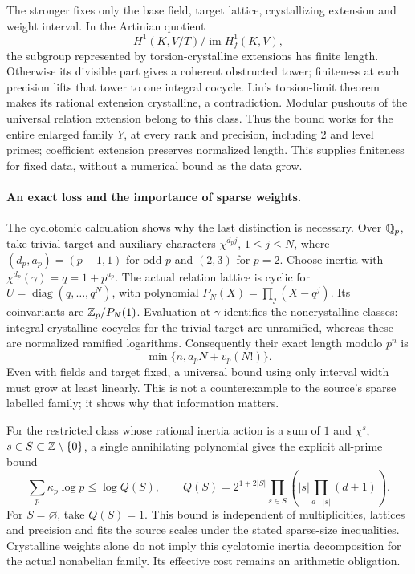 The stronger
 fixes only the base field, target lattice, crystallizing
extension and weight interval. In the Artinian quotient
\[
 H^1(K,V/T)\big/\operatorname{im}H_f^1(K,V),
\]
the subgroup represented by torsion-crystalline extensions has finite
length. Otherwise its divisible part gives a coherent obstructed tower;
finiteness at each precision lifts that tower to one integral cocycle.
Liu's torsion-limit theorem makes its rational extension crystalline,
a contradiction. Modular pushouts of the universal relation extension
belong to this class. Thus the bound works for the entire enlarged
family \(Y\), at every rank and precision, including 2 and level primes;
coefficient extension preserves normalized length. This supplies
finiteness for fixed data, without a numerical bound as the data grow.

\paragraph{An exact loss and the importance of sparse weights.}
The 
{cyclotomic calculation} shows why the last distinction is necessary.
Over \(\mathbb Q_p\), take trivial target and auxiliary characters
\(\chi^{d_pj}\), \(1\le j\le N\), where
\((d_p,a_p)=(p-1,1)\) for odd \(p\) and \((2,3)\) for \(p=2\).
Choose inertia with \(\chi^{d_p}(\gamma)=q=1+p^{a_p}\).
The actual relation lattice is cyclic for
\(U=\operatorname{diag}(q,\ldots,q^N)\), with polynomial
\(P_N(X)=\prod_j(X-q^j)\). Its coinvariants are
\(\mathbb Z_p/P_N(1)\). Evaluation at \(\gamma\) identifies the
noncrystalline classes: integral crystalline cocycles for the trivial
target are unramified, whereas these are normalized ramified logarithms.
Consequently their exact length modulo \(p^n\) is
\[
 \min\{n,a_pN+v_p(N!)\}.
\]
Even with fields and target fixed, a universal bound using only interval
width must grow at least linearly. This is not a counterexample to the
source's sparse labelled family; it shows why that information matters.

For the restricted class whose rational inertia action is a sum of
\(1\) and \(\chi^s\), \(s\in S\subset\mathbb Z\setminus\{0\}\), a
single annihilating polynomial gives the explicit all-prime bound
\[
 \sum_p\kappa_p\log p\le\log Q(S),\qquad
 Q(S)=2^{1+2|S|}\prod_{s\in S}
       \left(|s|\prod_{d\mid |s|}(d+1)\right).
\]
For \(S=\varnothing\), take \(Q(S)=1\). This bound is independent
of multiplicities, lattices and precision and fits the source scales
under the stated sparse-size inequalities. Crystalline weights alone
do not imply this cyclotomic inertia decomposition for the actual
nonabelian family. Its effective cost remains an arithmetic obligation.

